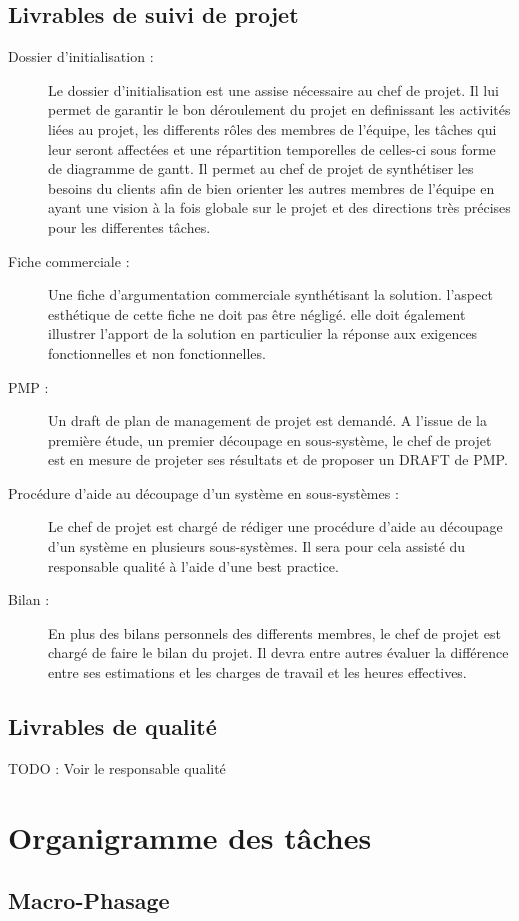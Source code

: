\subsection{Livrables de suivi de projet}
\begin{description}
\item[Dossier d'initialisation :]
Le dossier d'initialisation est une assise nécessaire au chef de projet. Il lui permet de garantir le bon déroulement du projet en definissant les activités liées au projet,
les differents rôles des membres de l'équipe, les tâches qui leur seront affectées et une répartition temporelles de celles-ci sous forme de diagramme de gantt.
Il permet au chef de projet de synthétiser les besoins du clients afin de bien orienter les autres membres de l'équipe en ayant une vision à la fois globale sur le projet
et des directions très précises pour les differentes tâches.
\item[Fiche commerciale :]
Une fiche d'argumentation commerciale synthétisant la solution. l'aspect esthétique de cette fiche ne doit pas être négligé. elle doit également illustrer
l'apport de la solution en particulier la réponse aux exigences fonctionnelles et non fonctionnelles.
\item[PMP :]
Un draft de plan de management de projet est demandé. A l'issue de la première étude, un premier découpage en sous-système, le chef de projet 
est en mesure de projeter ses résultats et de proposer un DRAFT de PMP.
\item[Procédure d'aide au découpage d'un système en sous-systèmes :]
Le chef de projet est chargé de rédiger une procédure d'aide au découpage d'un système en plusieurs sous-systèmes. Il sera pour cela assisté
du responsable qualité à l'aide d'une best practice. 
\item[Bilan :]
En plus des bilans personnels des differents membres, le chef de projet est chargé de faire le bilan du projet. Il devra entre autres évaluer
la différence entre ses estimations et les charges de travail et les heures effectives.
\end{description}
\subsection{Livrables de qualité}
TODO : Voir le responsable qualité
\section{Organigramme des tâches}
\subsection{Macro-Phasage}

